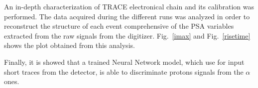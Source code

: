 An in-depth characterization of TRACE electronical chain and its calibration was performed. The data acquired during the different runs was analyzed in order to reconstruct the structure of each event comprehensive of the PSA variables extracted from the raw signals from the digitizer. Fig.~\ref{imax} and Fig.~\ref{risetime} shows the plot obtained from this analysis.

Finally, it is showed that a trained Neural Network model, which use for input short traces from the detector, is able to discriminate protons signals from the $\alpha$ ones.
